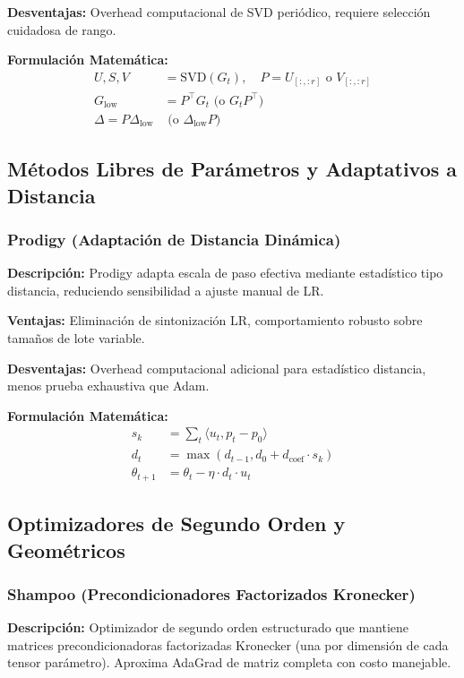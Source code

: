 \documentclass[11pt,a4paper]{article}
\begin{document}
\textbf{Desventajas:} Overhead computacional de SVD periódico, requiere selección cuidadosa de rango.

\textbf{Formulación Matemática:}
\begin{align}
U, S, V &= \text{SVD}(G_t), \quad P = U_{[:, :r]} \text{ o } V_{[:, :r]} \\
G_{\text{low}} &= P^\top G_t \text{ (o } G_t P^\top\text{)} \\
\Delta = P \Delta_{\text{low}} &\text{ (o } \Delta_{\text{low}} P\text{)}
\end{align}

\subsection{Métodos Libres de Parámetros y Adaptativos a Distancia}

\subsubsection{Prodigy (Adaptación de Distancia Dinámica)}

\textbf{Descripción:} Prodigy adapta escala de paso efectiva mediante estadístico tipo distancia, reduciendo sensibilidad a ajuste manual de LR.

\textbf{Ventajas:} Eliminación de sintonización LR, comportamiento robusto sobre tamaños de lote variable.

\textbf{Desventajas:} Overhead computacional adicional para estadístico distancia, menos prueba exhaustiva que Adam.

\textbf{Formulación Matemática:}
\begin{align}
s_k &= \sum_t \langle u_t, p_t - p_0 \rangle \\
d_t &= \max(d_{t-1}, d_0 + d_{\text{coef}} \cdot s_k) \\
\theta_{t+1} &= \theta_t - \eta \cdot d_t \cdot u_t
\end{align}

\subsection{Optimizadores de Segundo Orden y Geométricos}

\subsubsection{Shampoo (Precondicionadores Factorizados Kronecker)}

\textbf{Descripción:} Optimizador de segundo orden estructurado que mantiene matrices precondicionadoras factorizadas Kronecker (una por dimensión de cada tensor parámetro). Aproxima AdaGrad de matriz completa con costo manejable.
\end{document}
